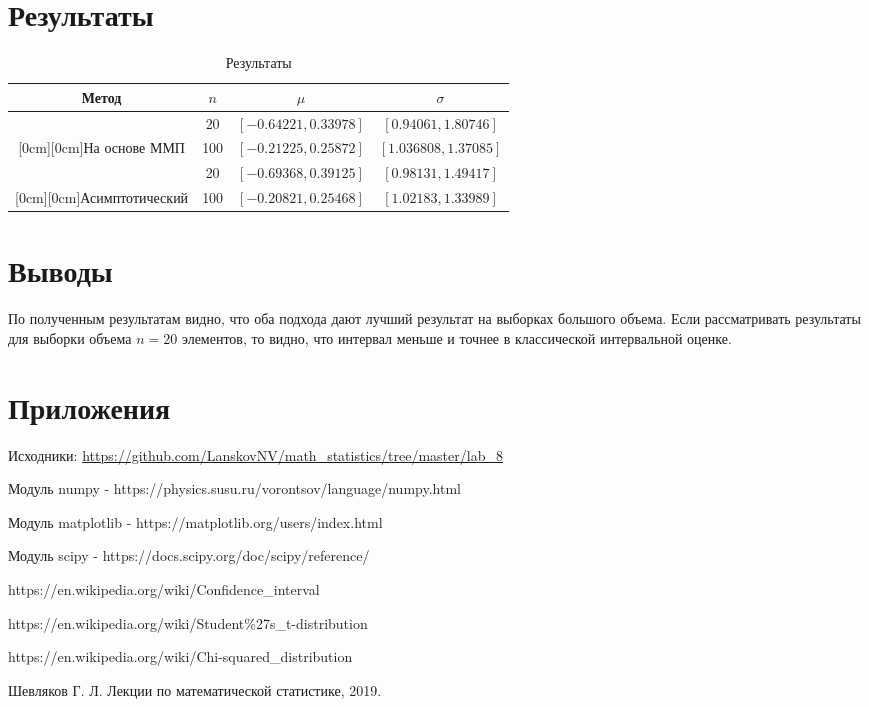 \documentclass[12pt]{article}
\begin{document}
\section{Результаты}

\begin{table}[H]
\caption{Результаты}
\label{tab:my_label1}
\begin{center}
\vspace{5mm}
\begin{tabular}{|c|c|c|c|}
\hline
Метод & $n$&$\mu$&$\sigma$\\
\hline
&$20$&	$[-0.64221, 0.33978]$&		$[0.94061, 1.80746]$ \\
\cline{2-4}
\raisebox{1.5ex}[0cm][0cm]{На основе ММП}&100&	$[-0.21225, 0.25872]$&	$[1.036808, 1.37085]$\\
\hline
&20&	$[-0.69368, 0.39125]$&		$[0.98131, 1.49417]$ \\
\cline{2-4}
\raisebox{1.5ex}[0cm][0cm]{Асимптотический}&100	&$[-0.20821, 0.25468]$&	$[1.02183, 1.33989]$\\
\hline
\end{tabular}
\end{center}
\end{table}


\section{Выводы}

По полученным результатам видно, что оба подхода дают лучший результат на выборках большого объема. Если рассматривать результаты для выборки объема $n=20$ элементов, то видно, что интервал меньше и точнее в классической интервальной оценке.

\section{Приложения}

Исходники: \url{https://github.com/LanskovNV/math_statistics/tree/master/lab_8}

\begin{thebibliography}{}
      Модуль numpy  -  https://physics.susu.ru/vorontsov/language/numpy.html
    
    Модуль matplotlib - https://matplotlib.org/users/index.html
    
    Модуль scipy - https://docs.scipy.org/doc/scipy/reference/
    

https://en.wikipedia.org/wiki/Confidence\_interval

https://en.wikipedia.org/wiki/Student\%27s\_t-distribution

https://en.wikipedia.org/wiki/Chi-squared\_distribution

Шевляков Г. Л. Лекции по математической статистике, 2019.

\end{thebibliography}
\end{document}

